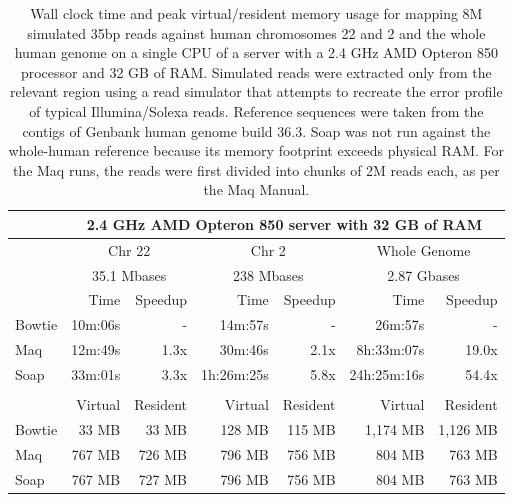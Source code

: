 \documentclass[letterpaper]{article}
\begin{document}
\begin{table}[tp]
\scriptsize
\begin{tabular}{lrrrrrr}
 & \multicolumn{6}{c}{2.4 GHz AMD Opteron 850 server with 32 GB of RAM} \\[3pt] 
\toprule
 & \multicolumn{2}{c}{Chr 22} & \multicolumn{2}{c}{Chr 2} & \multicolumn{2}{c}{Whole Genome} \\[3pt] 
 & \multicolumn{2}{c}{35.1 Mbases} & \multicolumn{2}{c}{238 Mbases} & \multicolumn{2}{c}{2.87 Gbases} \\[3pt] 
 & Time & Speedup & Time & Speedup & Time & Speedup \\ 
\toprule
Bowtie & 10m:06s & - & 14m:57s & - & 26m:57s & -  \\ \midrule 
Maq & 12m:49s & 1.3x & 30m:46s & 2.1x & 8h:33m:07s & 19.0x  \\ \midrule 
Soap & 33m:01s & 3.3x & 1h:26m:25s & 5.8x & 24h:25m:16s & 54.4x  \\[2pt] \bottomrule \\ 
 & Virtual & Resident & Virtual & Resident & Virtual & Resident \\ 
\toprule
Bowtie & 33 MB & 33 MB & 128 MB & 115 MB & 1,174 MB & 1,126 MB  \\ \midrule 
Maq & 767 MB & 726 MB & 796 MB & 756 MB & 804 MB & 763 MB  \\ \midrule 
Soap & 767 MB & 727 MB & 796 MB & 756 MB & 804 MB & 763 MB  \\ 
\bottomrule
\end{tabular}
\scriptsize\caption{Wall clock time and peak virtual/resident memory usage for mapping 8M simulated 35bp reads against human chromosomes 22 and 2 and the whole human genome on a single CPU of a server with a 2.4 GHz AMD Opteron 850 processor and 32 GB of RAM. Simulated reads were extracted only from the relevant region using a read simulator that attempts to recreate the error profile of typical Illumina/Solexa reads. Reference sequences were taken from the contigs of Genbank human genome build 36.3. Soap was not run against the whole-human reference because its memory footprint exceeds physical RAM. For the Maq runs, the reads were first divided into chunks of 2M reads each, as per the Maq Manual.}
\end{table}
\end{document}

